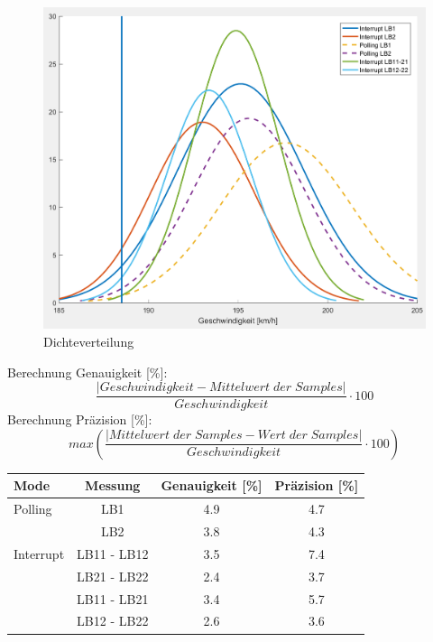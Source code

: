 \begin{figure}[ht]
    \centering
    \includegraphics[width=\textwidth]{images/densi.png}
    \caption{Dichteverteilung}
    \label{fig:density}
\end{figure}
Berechnung Genauigkeit [\%]:
\[ \frac{|Geschwindigkeit - Mittelwert\;der \; Samples|}{Geschwindigkeit}\cdot 100 \]
%
Berechnung Präzision [\%]:
\[ max\left(\frac{|Mittelwert \; der \; Samples-Wert\;  der\; Samples|}{Geschwindigkeit}\cdot 100\right) \]
\begin{tabular}{lccc}
	\textbf{Mode} & \textbf{Messung} & \textbf{Genauigkeit [\%]} & \textbf{Präzision [\%]} \\ \hline
	Polling       &       LB1        & 4.9                       & 4.7                     \\
	              &       LB2        & 3.8                       & 4.3                     \\
	Interrupt     &   LB11 - LB12    & 3.5                       & 7.4                     \\
	              &   LB21 - LB22    & 2.4                       & 3.7                     \\
	              &   LB11 - LB21    & 3.4                       & 5.7                     \\
	              &   LB12 - LB22    & 2.6                       & 3.6
\end{tabular}



